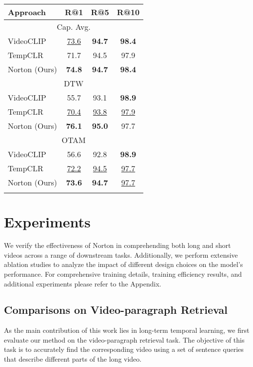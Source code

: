 \begin{table}[t]
\begin{minipage}[t]{0.37\linewidth}
{{\begin{tabular}{lccc}
Approach         & R@1  & R@5  & R@10 \\ \hline
        \multicolumn{4}{c}{ Cap. Avg.} \\ \hline
VideoCLIP       & \underline{73.6} & \textbf{94.7} & \textbf{98.4} \\
TempCLR & 71.7&  94.5 & 97.9            \\
Norton (Ours)    & \textbf{74.8}&\textbf{94.7}&\textbf{98.4}        \\  \hline
\multicolumn{4}{c}{{DTW}} \\ \hline
VideoCLIP  & 55.7 & 93.1 & \textbf{98.9}       \\
TempCLR           &\underline{70.4}&  \underline{93.8} & \underline{97.9} \\
Norton (Ours)         
& \textbf{76.1} &\textbf{95.0} & {97.7}
\\
        \hline
\multicolumn{4}{c}{OTAM} \\ \hline
VideoCLIP   & 56.6& 92.8 &\textbf{98.9} \\
TempCLR       & \underline{72.2}&  \underline{94.5} & \underline{97.7}           \\
Norton (Ours)    & \textbf{73.6}& \textbf{94.7}& \underline{97.7} \\
\shline
    \end{tabular}
}}
\end{minipage}
\end{table}

\section{Experiments}
We verify the effectiveness of Norton in comprehending both long and short videos across a range of downstream tasks. Additionally, we perform extensive ablation studies to analyze the impact of different design choices on the model's performance. For comprehensive training details, training efficiency results, and additional experiments please refer to the Appendix.

\subsection{Comparisons on Video-paragraph Retrieval}
\label{sec:4.1}

As the main contribution of this work lies in long-term temporal learning, we first evaluate our method on the video-paragraph retrieval task. The objective of this task is to accurately find the corresponding video using a set of sentence queries that describe different parts of the long video.

